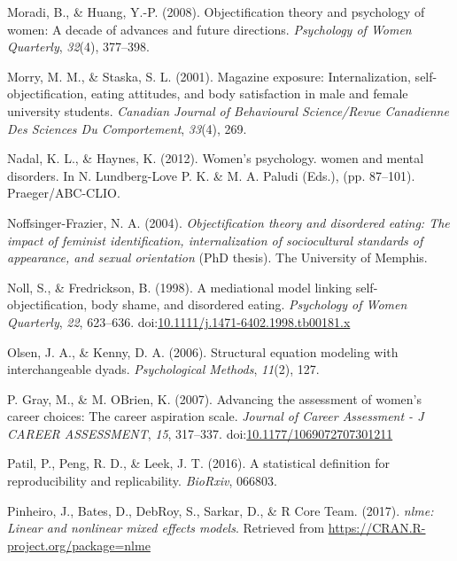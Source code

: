 \documentclass[man]{apa6}
\begin{document}
\hypertarget{ref-moradi2008}{}
Moradi, B., \& Huang, Y.-P. (2008). Objectification theory and
psychology of women: A decade of advances and future directions.
\emph{Psychology of Women Quarterly}, \emph{32}(4), 377--398.

\hypertarget{ref-morry2001magazine}{}
Morry, M. M., \& Staska, S. L. (2001). Magazine exposure:
Internalization, self-objectification, eating attitudes, and body
satisfaction in male and female university students. \emph{Canadian
Journal of Behavioural Science/Revue Canadienne Des Sciences Du
Comportement}, \emph{33}(4), 269.

\hypertarget{ref-nadal2012effects}{}
Nadal, K. L., \& Haynes, K. (2012). Women's psychology. women and mental
disorders. In N. Lundberg-Love P. K. \& M. A. Paludi (Eds.), (pp.
87--101). Praeger/ABC-CLIO.

\hypertarget{ref-noffsinger2004objectification}{}
Noffsinger-Frazier, N. A. (2004). \emph{Objectification theory and
disordered eating: The impact of feminist identification,
internalization of sociocultural standards of appearance, and sexual
orientation} (PhD thesis). The University of Memphis.

\hypertarget{ref-nollfredrickson1998}{}
Noll, S., \& Fredrickson, B. (1998). A mediational model linking
self-objectification, body shame, and disordered eating.
\emph{Psychology of Women Quarterly}, \emph{22}, 623--636.
doi:\href{https://doi.org/10.1111/j.1471-6402.1998.tb00181.x}{10.1111/j.1471-6402.1998.tb00181.x}

\hypertarget{ref-olsen2006structural}{}
Olsen, J. A., \& Kenny, D. A. (2006). Structural equation modeling with
interchangeable dyads. \emph{Psychological Methods}, \emph{11}(2), 127.

\hypertarget{ref-grayobrien2007}{}
P. Gray, M., \& M. OBrien, K. (2007). Advancing the assessment of
women's career choices: The career aspiration scale. \emph{Journal of
Career Assessment - J CAREER ASSESSMENT}, \emph{15}, 317--337.
doi:\href{https://doi.org/10.1177/1069072707301211}{10.1177/1069072707301211}

\hypertarget{ref-patil2016statistical}{}
Patil, P., Peng, R. D., \& Leek, J. T. (2016). A statistical definition
for reproducibility and replicability. \emph{BioRxiv}, 066803.

\hypertarget{ref-R-nlme}{}
Pinheiro, J., Bates, D., DebRoy, S., Sarkar, D., \& R Core Team. (2017).
\emph{nlme: Linear and nonlinear mixed effects models}. Retrieved from
\url{https://CRAN.R-project.org/package=nlme}
\end{document}
